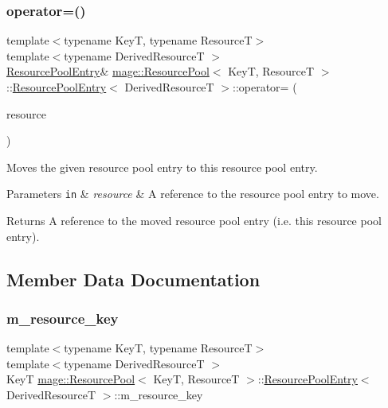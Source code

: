 \subsubsection{\texorpdfstring{operator=()}{operator=()}\hspace{0.1cm}{\footnotesize\ttfamily [2/2]}}
{\footnotesize\ttfamily template$<$typename KeyT, typename ResourceT$>$ \\
template$<$typename Derived\+ResourceT $>$ \\
\hyperlink{structmage_1_1_resource_pool_1_1_resource_pool_entry}{Resource\+Pool\+Entry}\& \hyperlink{classmage_1_1_resource_pool}{mage\+::\+Resource\+Pool}$<$ KeyT, ResourceT $>$\+::\hyperlink{structmage_1_1_resource_pool_1_1_resource_pool_entry}{Resource\+Pool\+Entry}$<$ Derived\+ResourceT $>$\+::operator= (\begin{DoxyParamCaption}\item[{\hyperlink{structmage_1_1_resource_pool_1_1_resource_pool_entry}{Resource\+Pool\+Entry}$<$ Derived\+ResourceT $>$ \&\&}]{resource }\end{DoxyParamCaption})\hspace{0.3cm}{\ttfamily [delete]}}

Moves the given resource pool entry to this resource pool entry.


\begin{DoxyParams}[1]{Parameters}
\mbox{\tt in}  & {\em resource} & A reference to the resource pool entry to move. \\
\hline
\end{DoxyParams}
\begin{DoxyReturn}{Returns}
A reference to the moved resource pool entry (i.\+e. this resource pool entry). 
\end{DoxyReturn}


\subsection{Member Data Documentation}
\hypertarget{structmage_1_1_resource_pool_1_1_resource_pool_entry_a2ca0b2ee479f64dbec5288a9a8b2b4c9}{}\label{structmage_1_1_resource_pool_1_1_resource_pool_entry_a2ca0b2ee479f64dbec5288a9a8b2b4c9} 
\subsubsection{\texorpdfstring{m\+\_\+resource\+\_\+key}{m\_resource\_key}}
{\footnotesize\ttfamily template$<$typename KeyT, typename ResourceT$>$ \\
template$<$typename Derived\+ResourceT $>$ \\
KeyT \hyperlink{classmage_1_1_resource_pool}{mage\+::\+Resource\+Pool}$<$ KeyT, ResourceT $>$\+::\hyperlink{structmage_1_1_resource_pool_1_1_resource_pool_entry}{Resource\+Pool\+Entry}$<$ Derived\+ResourceT $>$\+::m\+\_\+resource\+\_\+key\hspace{0.3cm}{\ttfamily [private]}}

